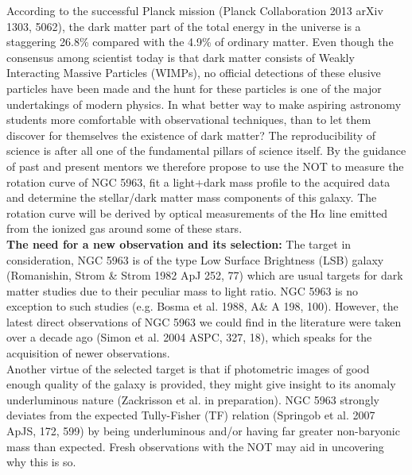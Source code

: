 \documentclass[11pt]{article}           %
\begin{document}
\begin{scienpage}[][]{}
{\noindent According to the successful Planck mission (Planck Collaboration 2013 arXiv 1303, 5062), the dark matter
part of the total energy in the universe is a staggering 26.8\%
compared with the 4.9\% of ordinary matter. Even though the consensus among scientist
today is that dark matter consists of Weakly Interacting Massive Particles
(WIMPs), no official detections of these elusive particles have been made and
the hunt for these particles is one of the major undertakings of modern physics.
In what better way to make aspiring astronomy students more comfortable
with observational techniques, than to let them discover for
themselves the existence of dark matter? The reproducibility of science is
after all one of the fundamental pillars of science itself.
By the guidance of past and present mentors we therefore propose to use the
NOT
to measure the rotation curve of NGC 5963, fit a light+dark mass profile 
to the acquired data and determine the stellar/dark matter mass components of
this galaxy. The rotation curve will be derived by optical measurements
of the H$\alpha$ line emitted from the ionized gas around some of these stars.   \\

\noindent \textbf{The need for a new observation and its selection:} The target in consideration, NGC 5963 is of the type Low Surface Brightness (LSB) galaxy (Romanishin, Strom \& Strom 1982 ApJ 252, 77) which are usual targets for dark matter studies due to their peculiar mass to light ratio. NGC 5963 is no exception to such studies (e.g. Bosma et al. 1988, A\& A 198, 100). However, the latest  direct observations of NGC 5963 we could find in the literature were taken over a decade ago (Simon et al. 2004 ASPC, 327, 18), which speaks for the acquisition of newer observations. \\

\noindent Another virtue of the selected target is that if photometric images of good enough quality of the galaxy is provided, they might give insight to its anomaly underluminous nature (Zackrisson et al. in preparation). NGC 5963 strongly deviates from the expected Tully-Fisher (TF) relation (Springob et al. 2007 ApJS, 172, 599) by being underluminous and/or having far greater non-baryonic mass than expected. Fresh observations with the NOT may aid in uncovering why this is so.
 
   }
\end{scienpage}
\end{document}
